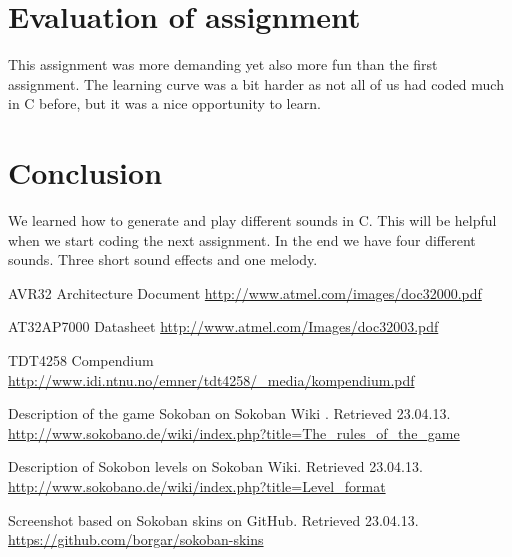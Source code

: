 \documentclass[a4paper,11pt]{article}
\begin{document}
\newpage

\section{Evaluation of assignment}
This assignment was more demanding yet also more fun than the first assignment. The learning curve was a bit harder as not all of us had coded much in C before, but it was a nice opportunity to learn.

\section{Conclusion}
We learned how to generate and play different sounds in C. This will be helpful when we start coding the next assignment. In the end we have four different sounds. Three short sound effects and one melody. 

\footnotesize{  %
\begin{thebibliography}{N}

 AVR32 Architecture Document
\url{http://www.atmel.com/images/doc32000.pdf}

 AT32AP7000 Datasheet
\url{http://www.atmel.com/Images/doc32003.pdf}

 TDT4258 Compendium
\url{http://www.idi.ntnu.no/emner/tdt4258/_media/kompendium.pdf}

 Description of the game Sokoban on Sokoban Wiki . Retrieved 23.04.13.
\url{http://www.sokobano.de/wiki/index.php?title=The_rules_of_the_game}

 Description of Sokobon levels on Sokoban Wiki. Retrieved 23.04.13.
\url{http://www.sokobano.de/wiki/index.php?title=Level_format}

 Screenshot based on Sokoban skins on GitHub. Retrieved 23.04.13.
\url{https://github.com/borgar/sokoban-skins}


\end{thebibliography}  
}
\end{document}
